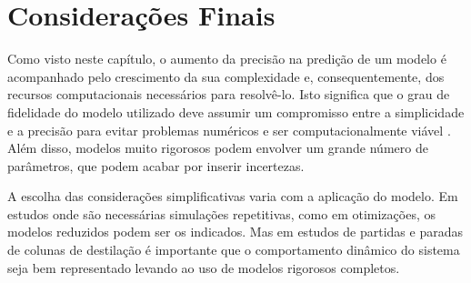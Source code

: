 % 
% 

\section{Considerações Finais} \label{sec:consideracoesfinais}

Como visto neste capítulo, o aumento da precisão na predição de um modelo é
acompanhado pelo crescimento da sua complexidade e, consequentemente, dos
recursos computacionais necessários para resolvê-lo. Isto significa que o grau de fidelidade do modelo
utilizado deve assumir um compromisso entre a simplicidade e a precisão para
evitar problemas numéricos e ser computacionalmente viável
\cite{Klingberg:2000}.
Além disso, modelos muito rigorosos podem envolver um grande número de
parâmetros, que podem acabar por inserir incertezas.

A escolha das considerações simplificativas varia com a aplicação do modelo.
Em estudos onde são necessárias simulações repetitivas, como em otimizações,
os modelos reduzidos podem ser os indicados. Mas em estudos de partidas e
paradas de colunas de destilação é importante que o comportamento dinâmico do
sistema seja bem representado levando ao uso de modelos rigorosos completos.
